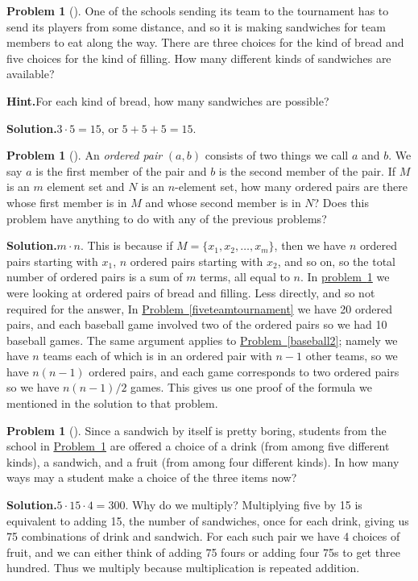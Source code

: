 \documentclass[10pt,]{book}
\theoremstyle{plain}
\theoremstyle{definition}
\newtheorem{activity}[project]{Problem}
\theoremstyle{definition}
\numberwithin{equation}{chapter}
\begin{document}
\begin{activity}[]\label{basicsandwiches}
One of the schools sending its team to the tournament has to send its players from some distance, and so it is making sandwiches for team members to eat along the way. There are three choices for the kind of bread and five choices for the kind of filling. How many different kinds of sandwiches are available?%
\par\medskip\noindent%
\textbf{Hint.}\quad For each kind of bread, how many sandwiches are possible?%
\par\medskip\noindent%
\textbf{Solution.}\quad \(3\cdot5=15\), or \(5+5+5=15\).%
\end{activity}
\begin{activity}[]\label{orderedpair}
An \emph{ordered pair} \((a,b)\) consists of two things we call \(a\) and \(b\). We say \(a\) is the first member of the pair and \(b\) is the second member of the pair. If \(M\) is an \(m\) element set and \(N\) is an \(n\)-element set, how many ordered pairs are there whose first member is in \(M\) and whose second member is in \(N\)? Does this problem have anything to do with any of the previous problems?%
\par\medskip\noindent%
\textbf{Solution.}\quad \(m\cdot n\). This is because if \(M = \{x_1,x_2,\ldots, x_m\}\), then we have \(n\) ordered pairs starting with \(x_1\), \(n\) ordered pairs starting with \(x_2\), and so on, so the total number of ordered pairs is a sum of \(m\) terms, all equal to \(n\). In \hyperref[basicsandwiches]{problem~\ref{basicsandwiches}} we were looking at ordered pairs of bread and filling. Less directly, and so not required for the answer, In \hyperref[fiveteamtournament]{Problem~\ref{fiveteamtournament}} we have 20 ordered pairs, and each baseball game involved two of the ordered pairs so we had 10 baseball games. The same argument applies to \hyperref[baseball2]{Problem~\ref{baseball2}}; namely we have \(n\) teams each of which is in an ordered pair with \(n-1\) other teams, so we have \(n(n-1)\) ordered pairs, and each game corresponds to two ordered pairs so we have \(n(n-1)/2\) games. This gives us one proof of the formula we mentioned in the solution to that problem.%
\end{activity}
\begin{activity}[]\label{completelunch}
Since a sandwich by itself is pretty boring, students from the school in \hyperref[basicsandwiches]{Problem~\ref{basicsandwiches}} are offered a choice of a drink (from among five different kinds), a sandwich, and a fruit (from among four different kinds). In how many ways may a student make a choice of the three items now?%
\par\medskip\noindent%
\textbf{Solution.}\quad \(5\cdot15\cdot4 = 300\). Why do we multiply? Multiplying five by 15 is equivalent to adding 15, the number of sandwiches, once for each drink, giving us 75 combinations of drink and sandwich. For each such pair we have 4 choices of fruit, and we can either think of adding 75 fours or adding four 75s to get three hundred. Thus we multiply because multiplication is repeated addition.%
\end{activity}
\end{document}

